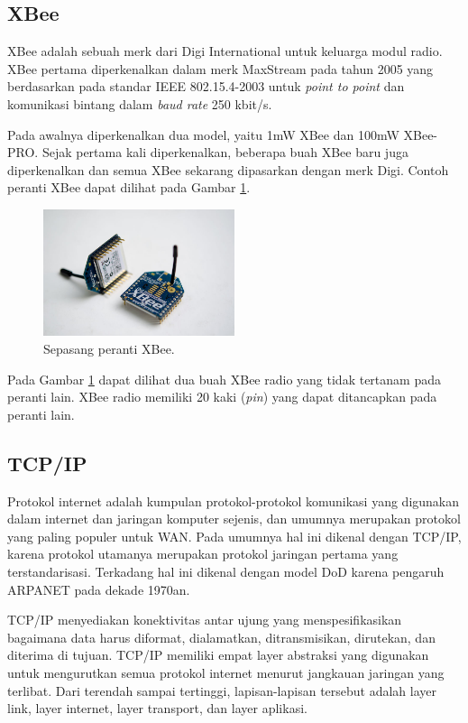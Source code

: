   \subsection{XBee}
    XBee adalah sebuah merk dari Digi International untuk keluarga modul radio. XBee pertama diperkenalkan dalam merk MaxStream pada tahun 2005 yang berdasarkan pada standar IEEE 802.15.4-2003 untuk \emph{point to point} dan komunikasi bintang dalam \emph{baud rate} 250 kbit/s.

    Pada awalnya diperkenalkan dua model, yaitu 1mW XBee dan 100mW XBee-PRO. Sejak pertama kali diperkenalkan, beberapa buah XBee baru juga diperkenalkan dan semua XBee sekarang dipasarkan dengan merk Digi. Contoh peranti XBee dapat dilihat pada Gambar \ref{xbee}.

      \begin{figure}[H]
        \centering
          \includegraphics[width=0.5\textwidth]{gambar/xbee}
          \caption{Sepasang peranti XBee.}
          \label{xbee}
      \end{figure}

    Pada Gambar \ref{xbee} dapat dilihat dua buah XBee radio yang tidak tertanam pada peranti lain. XBee radio memiliki 20 kaki (\emph{pin}) yang dapat ditancapkan pada peranti lain.

  \subsection{TCP/IP}
    Protokol internet adalah kumpulan protokol-protokol komunikasi yang digunakan dalam internet dan jaringan komputer sejenis, dan umumnya merupakan protokol yang paling populer untuk WAN. Pada umumnya hal ini dikenal dengan TCP/IP, karena protokol utamanya merupakan protokol jaringan pertama yang terstandarisasi. Terkadang hal ini dikenal dengan model DoD karena pengaruh ARPANET pada dekade 1970an.

    TCP/IP menyediakan konektivitas antar ujung yang menspesifikasikan bagaimana data harus diformat, dialamatkan, ditransmisikan, dirutekan, dan diterima di tujuan. TCP/IP memiliki empat layer abstraksi yang digunakan untuk mengurutkan semua protokol internet menurut jangkauan jaringan yang terlibat. Dari terendah sampai tertinggi, lapisan-lapisan tersebut adalah layer link, layer internet, layer transport, dan layer aplikasi.

